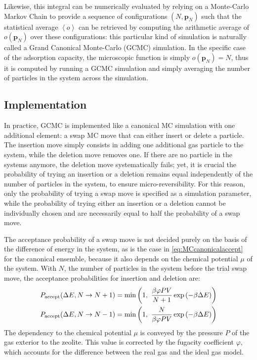 \documentclass[main.tex]{subfiles}
\begin{document}
Likewise, this integral can be numerically evaluated by relying on a Monte-Carlo Markov Chain to provide a sequence of configurations $(N, \boldsymbol p_N)$ such that the statistical average $\left<o\right>$ can be retrieved by computing the arithmetic average of $o\left({\boldsymbol p_N}\right)$ over these configurations: this particular kind of simulation is naturally called a Grand Canonical Monte-Carlo (GCMC) simulation. In the specific case of the adsorption capacity, the microscopic function is simply $o\left({\boldsymbol p_N}\right) = N$, thus it is computed by running a GCMC simulation and simply averaging the number of particles in the system across the simulation.

\subsection{Implementation}

In practice, GCMC is implemented like a canonical MC simulation with one additional element: a swap MC move that can either insert or delete a particle. The insertion move simply consists in adding one additional gas particle to the system, while the deletion move removes one. If there are no particle in the systems anymore, the deletion move systematically fails; yet, it is crucial the probability of trying an insertion or a deletion remains equal independently of the number of particles in the system, to ensure micro-reversibility. For this reason, only the probability of trying a swap move is specified as a simulation parameter, while the probability of trying either an insertion or a deletion cannot be individually chosen and are necessarily equal to half the probability of a swap move.

The acceptance probability of a swap move is not decided purely on the basis of the difference of energy in the system, as is the case in \cref{eq:MCcanonicalaccept} for the canonical ensemble, because it also depends on the chemical potential $\mu$ of the system. With $N$, the number of particles in the system before the trial swap move, the acceptance probabilities for insertion and deletion are:
\[\begin{split}
	P_\text{accept}(\Delta E, N\to N+1) &= \min\paren{1,\ \frac{\beta\varphi P V}{N+1}\exp\paren{-\beta\Delta E}}\\
	P_\text{accept}(\Delta E, N\to N-1) &= \min\paren{1,\ \frac{N}{\beta\varphi P V}\exp\paren{-\beta\Delta E}}
\end{split}\]
The dependency to the chemical potential $\mu$ is conveyed by the pressure $P$ of the gas exterior to the zeolite. This value is corrected by the fugacity coefficient $\varphi$, which accounts for the difference between the real gas and the ideal gas model.
\end{document}
